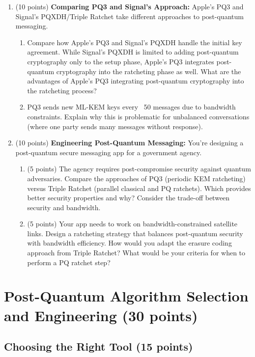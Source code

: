 \documentclass[10pt,a4paper,american]{article}
\begin{document}
\begin{enumerate}
	\item (10 points) \textbf{Comparing PQ3 and Signal's Approach:}
	      Apple's PQ3 and Signal's PQXDH/Triple Ratchet take different approaches to post-quantum messaging.
	      \begin{enumerate}
		      \item Compare how Apple's PQ3 and Signal's PQXDH handle the initial key agreement. While Signal's PQXDH is limited to adding post-quantum cryptography only to the setup phase, Apple's PQ3 integrates post-quantum cryptography into the ratcheting phase as well. What are the advantages of Apple's PQ3 integrating post-quantum cryptography into the ratcheting process?
		      \item PQ3 sends new ML-KEM keys every ~50 messages due to bandwidth constraints. Explain why this is problematic for unbalanced conversations (where one party sends many messages without response).
	      \end{enumerate}
	\item (10 points) \textbf{Engineering Post-Quantum Messaging:}
	      You're designing a post-quantum secure messaging app for a government agency.
	      \begin{enumerate}
		      \item (5 points) The agency requires post-compromise security against quantum adversaries. Compare the approaches of PQ3 (periodic KEM ratcheting) versus Triple Ratchet (parallel classical and PQ ratchets). Which provides better security properties and why? Consider the trade-off between security and bandwidth.
		      \item (5 points) Your app needs to work on bandwidth-constrained satellite links. Design a ratcheting strategy that balances post-quantum security with bandwidth efficiency. How would you adapt the erasure coding approach from Triple Ratchet? What would be your criteria for when to perform a PQ ratchet step?
	      \end{enumerate}
\end{enumerate}

\section{Post-Quantum Algorithm Selection and Engineering (30 points)}

\subsection{Choosing the Right Tool (15 points)}
\end{document}
